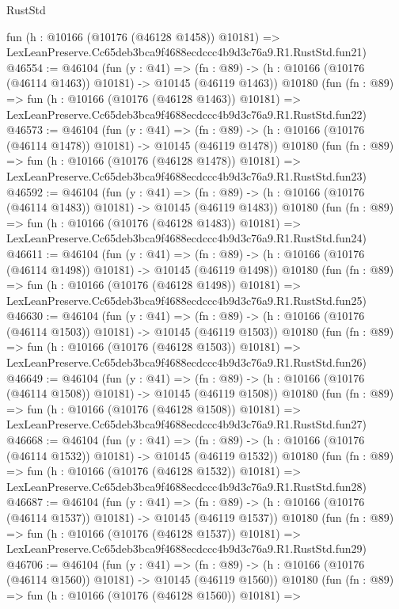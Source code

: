 \begin{lexlean}{RustStd}
\begin{coremodule}
    fun (h : @10166 (@10176 (@46128 @1458)) @10181) =>
    LexLeanPreserve.Cc65deb3bca9f4688ecdccc4b9d3c76a9.R1.RustStd.fun21)
@46554 := @46104
    (fun (y : @41) =>
    (fn : @89) -> (h : @10166 (@10176 (@46114 @1463)) @10181) -> @10145 (@46119 @1463))
    @10180
    (fun (fn : @89) =>
    fun (h : @10166 (@10176 (@46128 @1463)) @10181) =>
    LexLeanPreserve.Cc65deb3bca9f4688ecdccc4b9d3c76a9.R1.RustStd.fun22)
@46573 := @46104
    (fun (y : @41) =>
    (fn : @89) -> (h : @10166 (@10176 (@46114 @1478)) @10181) -> @10145 (@46119 @1478))
    @10180
    (fun (fn : @89) =>
    fun (h : @10166 (@10176 (@46128 @1478)) @10181) =>
    LexLeanPreserve.Cc65deb3bca9f4688ecdccc4b9d3c76a9.R1.RustStd.fun23)
@46592 := @46104
    (fun (y : @41) =>
    (fn : @89) -> (h : @10166 (@10176 (@46114 @1483)) @10181) -> @10145 (@46119 @1483))
    @10180
    (fun (fn : @89) =>
    fun (h : @10166 (@10176 (@46128 @1483)) @10181) =>
    LexLeanPreserve.Cc65deb3bca9f4688ecdccc4b9d3c76a9.R1.RustStd.fun24)
@46611 := @46104
    (fun (y : @41) =>
    (fn : @89) -> (h : @10166 (@10176 (@46114 @1498)) @10181) -> @10145 (@46119 @1498))
    @10180
    (fun (fn : @89) =>
    fun (h : @10166 (@10176 (@46128 @1498)) @10181) =>
    LexLeanPreserve.Cc65deb3bca9f4688ecdccc4b9d3c76a9.R1.RustStd.fun25)
@46630 := @46104
    (fun (y : @41) =>
    (fn : @89) -> (h : @10166 (@10176 (@46114 @1503)) @10181) -> @10145 (@46119 @1503))
    @10180
    (fun (fn : @89) =>
    fun (h : @10166 (@10176 (@46128 @1503)) @10181) =>
    LexLeanPreserve.Cc65deb3bca9f4688ecdccc4b9d3c76a9.R1.RustStd.fun26)
@46649 := @46104
    (fun (y : @41) =>
    (fn : @89) -> (h : @10166 (@10176 (@46114 @1508)) @10181) -> @10145 (@46119 @1508))
    @10180
    (fun (fn : @89) =>
    fun (h : @10166 (@10176 (@46128 @1508)) @10181) =>
    LexLeanPreserve.Cc65deb3bca9f4688ecdccc4b9d3c76a9.R1.RustStd.fun27)
@46668 := @46104
    (fun (y : @41) =>
    (fn : @89) -> (h : @10166 (@10176 (@46114 @1532)) @10181) -> @10145 (@46119 @1532))
    @10180
    (fun (fn : @89) =>
    fun (h : @10166 (@10176 (@46128 @1532)) @10181) =>
    LexLeanPreserve.Cc65deb3bca9f4688ecdccc4b9d3c76a9.R1.RustStd.fun28)
@46687 := @46104
    (fun (y : @41) =>
    (fn : @89) -> (h : @10166 (@10176 (@46114 @1537)) @10181) -> @10145 (@46119 @1537))
    @10180
    (fun (fn : @89) =>
    fun (h : @10166 (@10176 (@46128 @1537)) @10181) =>
    LexLeanPreserve.Cc65deb3bca9f4688ecdccc4b9d3c76a9.R1.RustStd.fun29)
@46706 := @46104
    (fun (y : @41) =>
    (fn : @89) -> (h : @10166 (@10176 (@46114 @1560)) @10181) -> @10145 (@46119 @1560))
    @10180
    (fun (fn : @89) =>
    fun (h : @10166 (@10176 (@46128 @1560)) @10181) =>

\end{coremodule}
\end{lexlean}
